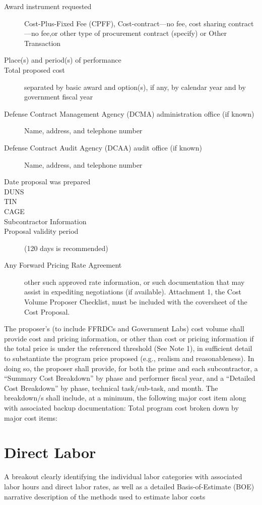 \begin{description}
\item [Award instrument requested] Cost-Plus-Fixed Fee (CPFF), Cost-contract—no fee, cost sharing contract—no fee,or other type of procurement contract (specify) or Other Transaction
\item [Place(s) and period(s) of performance]
\item [Total proposed cost] separated by basic award and option(s), if any, by calendar year
and by government fiscal year
\item [Defense Contract Management Agency (DCMA) administration office (if known)] Name, address, and telephone number
\item [Defense Contract Audit Agency (DCAA) audit office (if known)] Name, address, and telephone number
\item [Date proposal was prepared]
\item [DUNS]
\item [TIN]
\item [CAGE]
\item [Subcontractor Information]
\item [Proposal validity period] (120 days is recommended)
\item [Any Forward Pricing Rate Agreement] other such approved rate information, or such documentation that may assist in expediting negotiations (if available).
Attachment 1, the Cost Volume Proposer Checklist, must be included with the coversheet
of the Cost Proposal.
\end{description}
\newpage

The proposer’s (to include FFRDCs and Government Labs) cost volume shall provide cost and
pricing information, or other than cost or pricing information if the total price is under the
referenced threshold (See Note 1), in sufficient detail to substantiate the program price proposed
(e.g., realism and reasonableness). In doing so, the proposer shall provide, for both the prime
and each subcontractor, a “Summary Cost Breakdown” by phase and performer fiscal year,
and a “Detailed Cost Breakdown” by phase, technical task/sub-task, and month. The
breakdown/s shall include, at a minimum, the following major cost item along with associated
backup documentation:
Total program cost broken down by major cost items:

\section{Direct Labor}
A breakout clearly identifying the individual labor categories with associated labor hours and
direct labor rates, as well as a detailed Basis-of-Estimate (BOE) narrative description of the
methods used to estimate labor costs
